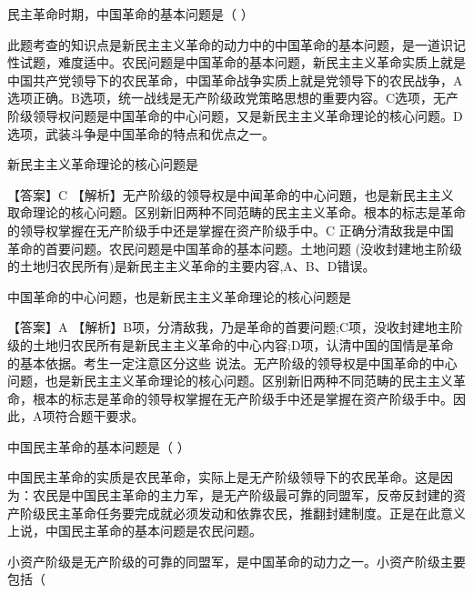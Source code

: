 \question 民主革命时期，中国革命的基本问题是（ ）
\par{}
\begin{solution}此题考查的知识点是新民主主义革命的动力中的中国革命的基本问题，是一道识记性试题，难度适中。农民问题是中国革命的基本问题，新民主主义革命实质上就是中国共产党领导下的农民革命，中国革命战争实质上就是党领导下的农民战争，A选项正确。B选项，统一战线是无产阶级政党策略思想的重要内容。C选项，无产阶级领导权问题是中国革命的中心问题，又是新民主主义革命理论的核心问题。D选项，武装斗争是中国革命的特点和优点之一。
\end{solution}
\question 新民主主义革命理论的核心问题是
\par{}
\begin{solution}【答案】C
【解析】无产阶级的领导权是中闻革命的中心问題，也是新民主主义取命理论的核心问题。区别新旧两种不同范畴的民主主义革命。根本的标志是革命的领导权掌握在无产阶级手中还是掌握在资产阶级手中。C
正确分清敌我是中国革命的首要问题。农民问题是中国革命的基本问题。土地问题
(没收封建地主阶级的土地归农民所有)是新民主主义革命的主要内容,A、B、D错误。
\end{solution}
\question 中国革命的中心问题，也是新民主主义革命理论的核心问题是
\par{}
\begin{solution}【答案】A
【解析】B项，分清敌我，乃是革命的首要问题;C项，没收封建地主阶级的土地归农民所有是新民主主义革命的中心内容;D项，认清中国的国情是革命的基本依据。考生一定注意区分这些
说法。无产阶级的领导权是中国革命的中心问题，也是新民主主义革命理论的核心问题。区别新旧两种不同范畴的民主主义革命，根本的标志是革命的领导权掌握在无产阶级手中还是掌握在资产阶级手中。因此，A项符合题干要求。
\end{solution}
\question 中国民主革命的基本问题是（ ）
\par{}
\begin{solution}中国民主革命的实质是农民革命，实际上是无产阶级领导下的农民革命。这是因为：农民是中国民主革命的主力军，是无产阶级最可靠的同盟军，反帝反封建的资产阶级民主革命任务要完成就必须发动和依靠农民，推翻封建制度。正是在此意义上说，中国民主革命的基本问题是农民问题。
\end{solution}
\question 小资产阶级是无产阶级的可靠的同盟军，是中国革命的动力之一。小资产阶级主要包括（

